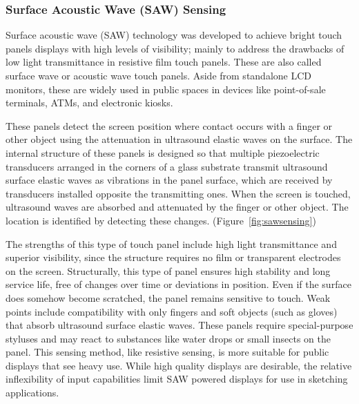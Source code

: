 \subsubsection{Surface Acoustic Wave (SAW) Sensing}

Surface acoustic wave (SAW) technology was developed to achieve bright touch panels displays with high levels of visibility; mainly to address the drawbacks of low light transmittance in resistive film touch panels. 
These are also called surface wave or acoustic wave touch panels. 
Aside from standalone LCD monitors, these are widely used in public spaces in devices like point-of-sale terminals, ATMs, and electronic kiosks.

These panels detect the screen position where contact occurs with a finger or other object using the attenuation in ultrasound elastic waves on the surface. 
The internal structure of these panels is designed so that multiple piezoelectric transducers arranged in the corners of a glass substrate transmit ultrasound surface elastic waves as vibrations in the panel surface, which are received by transducers installed opposite the transmitting ones. 
When the screen is touched, ultrasound waves are absorbed and attenuated by the finger or other object. 
The location is identified by detecting these changes.
(Figure~\ref{fig:sawsensing})



The strengths of this type of touch panel include high light transmittance and superior visibility, since the structure requires no film or transparent electrodes on the screen.
Structurally, this type of panel ensures high stability and long service life, free of changes over time or deviations in position. 
Even if the surface does somehow become scratched, the panel remains sensitive to touch.  
Weak points include compatibility with only fingers and soft objects (such as gloves) that absorb ultrasound surface elastic waves. 
These panels require special-purpose styluses and may react to substances like water drops or small insects on the panel.
This sensing method, like resistive sensing, is more suitable for public displays that see heavy use.
While high quality displays are desirable, the relative inflexibility of input capabilities limit SAW powered displays for use in sketching applications.



